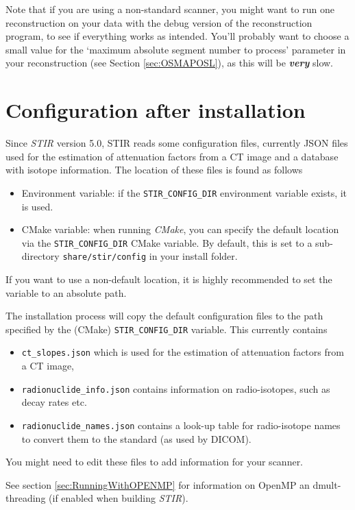 \documentclass{article}
\begin{document}
Note that if you are using a non-standard scanner, 
you might want to run one reconstruction on your data with 
the debug version of the reconstruction program, to see if everything 
works as intended. You'll probably want to choose a small value 
for the `maximum absolute segment number to process' parameter 
in your reconstruction (see Section \ref{sec:OSMAPOSL}), as this will be \textbf{\textit{very}} 
slow.


\section{Configuration after installation
\label{sec:configuration}
}
Since \textit{STIR} version 5.0, STIR reads some configuration files, currently JSON files used for
the estimation of attenuation factors from a CT image and a database with isotope information.
The location of these files is found as follows
\begin{itemize}
\item Environment variable: if the \texttt{STIR\_CONFIG\_DIR} environment variable exists, it is used.

\item CMake variable: when running \textit{CMake}, you can specify the default location via the
\texttt{STIR\_CONFIG\_DIR} CMake variable. By default, this is set to a sub-directory \texttt{share/stir/config}
in your install folder.
\end{itemize}
If you want to use a non-default location, it is highly recommended to set the variable to an absolute path.

The installation process will copy the default configuration files to the path specified by the
(CMake) \texttt{STIR\_CONFIG\_DIR} variable.
This currently contains
\begin{itemize}
\item \texttt{ct\_slopes.json} which is used for the estimation of attenuation factors from a CT image,
\item \texttt{radionuclide\_info.json} contains information on radio-isotopes, such as decay rates etc.
\item \texttt{radionuclide\_names.json} contains a look-up table for radio-isotope names to convert them
to the standard (as used by DICOM).
\end{itemize}
You might need to edit these files to add information for your scanner.

See section \ref{sec:RunningWithOPENMP} for information on OpenMP an dmult-threading (if enabled when building \textit{STIR}).
\end{document}
